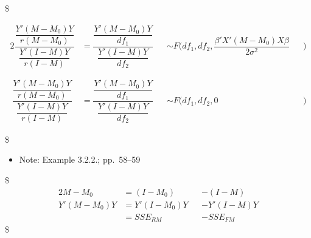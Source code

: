 \documentclass[
]{book}
\providecommand{\tightlist}{%
  \setlength{\itemsep}{0pt}\setlength{\parskip}{0pt}}
\begin{document}
{{{\$

\begin{alignat}{2}

\dfrac
{\dfrac{Y'(M-M_0)Y}{r(M-M_0)}}
{\dfrac{Y'(I-M)Y}{r(I-M)}}



&=


\dfrac
{\dfrac{Y'(M-M_0)Y}{df_1}}
{\dfrac{Y'(I-M)Y}{df_2}} 




&&\sim 


F \Bigg( df_1 , df_2, \dfrac{\beta' X' (M-M_0)X \beta }{2 \sigma^2} 



&& \Bigg) \tag{Under the FM}

\\

\\\


\\\




\dfrac
{\dfrac{Y'(M-M_0)Y}{r(M-M_0)}}
{\dfrac{Y'(I-M)Y}{r(I-M)}}



&=


\dfrac
{\dfrac{Y'(M-M_0)Y}{df_1}}
{\dfrac{Y'(I-M)Y}{df_2}}


&&\sim 


F \big( df_1 , df_2, 0 

&& \big) 

\tag{Under the RM}

\end{alignat}

\$

\begin{itemize}
\tightlist
\item
  Note: Example 3.2.2.; pp.~58--59
\end{itemize}

\$
\begin{alignat}{2}


M-M_0 &= (I-M_0) &&-(I-M)

\\

Y'(M-M_0)Y &= Y'(I-M_0)Y &&-Y'(I-M)Y

\\

 &= SSE_{RM} &&-SSE_{FM}




\end{alignat}
\$

\hypertarget{a-generalized-test-procedure}{%
}}}}
\end{document}
